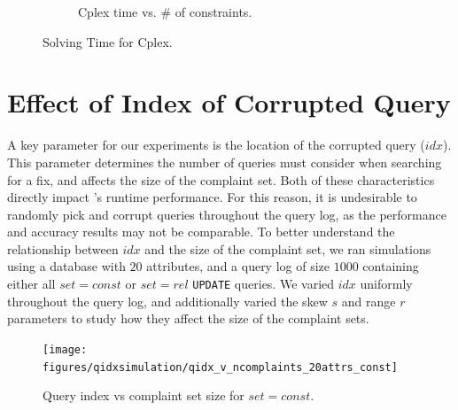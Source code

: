 \begin{figure}[t]
\begin{subfigure} [t]{.3\textwidth}
    \vspace*{-.25in}
    \caption{Cplex time vs. \# of constraints. }
    \vspace*{-.1in}
    \label{f:heuristic_time} 
    \end{subfigure}
   \caption{Solving Time for Cplex. }
   \vspace*{-.1in}
  \end{figure}

\section{Effect of Index of Corrupted Query}
\label{app:qidx}

A key parameter for our experiments is the location of the corrupted query ($idx$).  
This parameter determines the number of queries \sys must consider when searching for a fix,
and affects the size of the complaint set.  
Both of these characteristics directly impact \sys's 
runtime performance. For this reason, it is undesirable to randomly pick and corrupt queries
throughout the query log, as the performance and accuracy results may not be comparable. 
To better understand the relationship between $idx$ and the size of the complaint set, we ran
simulations using a database with $20$ attributes, and a query log of size $1000$ containing
either all $set = const$ or $set = rel$ \texttt{UPDATE} queries.
We varied  $idx$ uniformly throughout the query log, and additionally varied
the skew $s$ and range $r$ parameters to study how they affect the size of the complaint sets.


  \begin{figure}[h]
  \centering
  \texttt{[image: figures/qidxsimulation/qidx\_v\_ncomplaints\_20attrs\_const]}
  \caption{Query index vs complaint set size for $set = const$.}
  \label{f:qidx_v_ncomplaints_const} 
  \end{figure}


